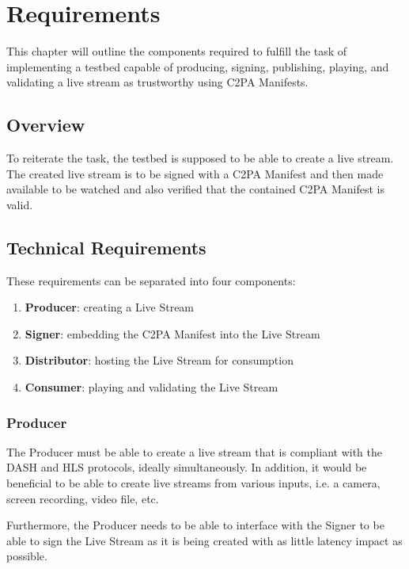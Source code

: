 \chapter{Requirements\label{cha:chapter3}}

This chapter will outline the components required to fulfill the task of implementing a testbed capable of producing, signing, publishing, playing, and validating a live stream as trustworthy using C2PA Manifests.

\section{Overview\label{sec:reqoverview}}

To reiterate the task, the testbed is supposed to be able to create a live stream. The created live stream is to be signed with a C2PA Manifest and then made available to be watched and also verified that the contained C2PA Manifest is valid. 

\section{Technical Requirements\label{sec:techreq}}

These requirements can be separated into four components:

\begin{enumerate}
    \item \textbf{Producer}: creating a Live Stream
    \item \textbf{Signer}: embedding the C2PA Manifest into the Live Stream
    \item \textbf{Distributor}: hosting the Live Stream for consumption
    \item \textbf{Consumer}: playing and validating the Live Stream
\end{enumerate}

\subsection{Producer}

The Producer must be able to create a live stream that is compliant with the DASH and HLS protocols, ideally simultaneously. In addition, it would be beneficial to be able to create live streams from various inputs, i.e. a camera, screen recording, video file, etc.

Furthermore, the Producer needs to be able to interface with the Signer to be able to sign the Live Stream as it is being created with as little latency impact as possible.

